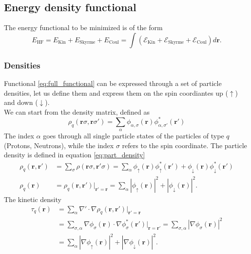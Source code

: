 \subsection{Energy density functional}
The energy functional to be minimized is of the form \cite{Bender2003}
\begin{equation}
\label{eq:full_functional}
E_{\text{HF}} =  E_\text{Kin}+E_\text{Skyrme}+E_\text{Coul} = \int( \mathcal E_\text{Kin} + \mathcal E_\text{Skyrme} + \mathcal E_\text{Coul})d\bm r.
\end{equation}
\subsubsection{Densities}
Functional \eqref{eq:full_functional} can be expressed through a set of particle densities, let us define them and express them on the spin coordiantes up ($\uparrow$) and down ($\downarrow$).
\\We can start from the density matrix, defined as
\begin{equation}
    \rho_q (\mathbf r \sigma, \mathbf r \sigma') = \sum_{\alpha} \phi_{\alpha, \sigma} (\mathbf r )\phi_{\alpha, \sigma'}^*(\mathbf r')
\end{equation}
The index $\alpha$ goes through all single particle states of the particles of type $q$ (Protons, Neutrons), while the index $\sigma$ refers to the spin coordinate. The particle density is defined in equation \eqref{eq:part_density} 
\begin{align}
    \rho_q(\mathbf r, \mathbf r') &= \sum_{\sigma}\rho(\mathbf r\sigma, \mathbf r'\sigma) =\sum_{\alpha} \phi_{\uparrow}(\mathbf r)\phi_{\uparrow}^*(\mathbf r')+\phi_{\downarrow}(\mathbf r)\phi_{\downarrow}^*(\mathbf r') \nonumber
    \\\rho_q(\mathbf r) &= \rho_q(\mathbf r, \mathbf r')\bigg|_{\mathbf r'=\mathbf r} =\sum_{\alpha} |\phi_{\uparrow}(\mathbf r)|^2+|\phi_{\downarrow}(\mathbf r)|^2.
    \label{eq:part_density}
\end{align}
The kinetic density
\begin{align}
    \tau_q(\mathbf r) &= \sum_{\alpha} \nabla'\cdot\nabla\rho_q(\mathbf r, \mathbf r')\bigg|_{\mathbf r'=\mathbf r} \nonumber
    \\&= \sum_{\sigma, \alpha} \nabla \phi_\sigma (\mathbf r)\cdot \nabla \phi_\sigma^*(\mathbf r')\bigg|_{\mathbf r = \mathbf r'} = \sum_{\sigma, \alpha} |\nabla \phi_\sigma(\mathbf r)|^2 \nonumber
    \\&= \sum_{\alpha}|\nabla \phi_\uparrow(\mathbf r)|^2 + |\nabla \phi_\downarrow(\mathbf r)|^2 \label{eq:kin_density}.
\end{align}
